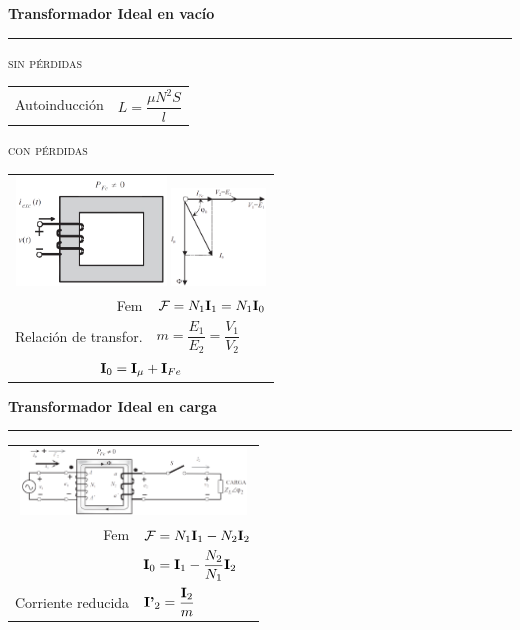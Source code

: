 \documentclass[11pt,a4paper]{article}
\newcommand{\fasor}[1]{\uppercase{\textbf{#1}}}
\newcommand{\subtitulo}[1]{
    \textbf{#1} \\ \vspace{.1cm} {\color{gray} \hrule}
}
\begin{document}
    \begin{cajita}
        \centering
        \begin{center}
            \subtitulo{Transformador Ideal \textnormal{en vacío}}
        \end{center}
        \vspace{-.3cm} \textsc{sin pérdidas} \vspace{.1cm}

        \begin{tabular}{r l}
            Autoinducción & $L = \dfrac{\mu N^2 S}{l}$ \\
        \end{tabular} \vspace{.4cm}

        \textsc{con pérdidas} \vspace{.1cm}

        \begin{tabular}{r l}
            \multicolumn{2}{c}{\includegraphics[width = 4cm]{vacio-cp-trafo}  \includegraphics[width = 2.5cm]{vacio-fasores}} \\
            Fem & $\mathcal{F} = N_1  \fasor{i}_1  = N_1  \fasor{i}_0$\\
            Relación de transfor. & $m = \dfrac{E_1}{E_2} = \dfrac{V_1}{V_2}$ \\
            \multicolumn{2}{c}{$ \fasor{i}_0 = \fasor{i}_\mu + \fasor{i}_{Fe} $} \\
        \end{tabular}
        
        \begin{center}
            \subtitulo{Transformador Ideal \textnormal{en carga}}
        \end{center}
        \begin{tabular}{r l}
            \multicolumn{2}{c}{\includegraphics[width = 6cm]{carga-trafo}} \\
            Fem & $\mathcal{F} = N_1  \fasor{i}_1 - N_2 \fasor{i}_2$\\
            & $\fasor{i}_0 = \fasor{i}_1 - \dfrac{N_2}{N_1} \fasor{i}_2$\\
            Corriente reducida & $\fasor{i'}_2 = \dfrac{\fasor{i}_2}{m}$ \\
        \end{tabular}


\end{cajita}
\end{document}
